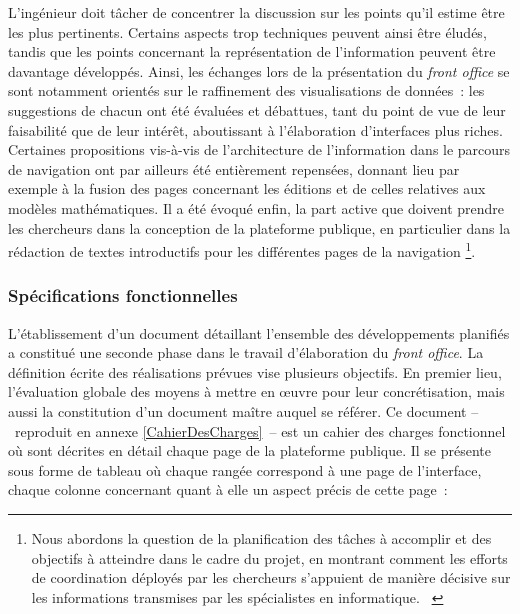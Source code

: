 \documentclass[a4paper,12pt,twoside]{book}
\newcommand{\eng}{\emph}
\newcommand{\fo}{\eng{front office}\xspace}
\newcommand{\g}[1]{\og#1~\fg}
\begin{document}
L'ingénieur doit tâcher de concentrer la discussion sur les points qu'il estime être les plus pertinents. Certains aspects trop techniques peuvent ainsi être éludés, tandis que les points concernant la représentation de l'information peuvent être davantage développés. Ainsi, les échanges lors de la présentation du \fo se sont notamment orientés sur le raffinement des visualisations de données~: les suggestions de chacun ont été évaluées et débattues, tant du point de vue de leur faisabilité que de leur intérêt, aboutissant à l'élaboration d'interfaces plus riches. Certaines propositions vis-à-vis de l'architecture de l'information dans le parcours de navigation ont par ailleurs été entièrement repensées, donnant lieu par exemple à la fusion des pages concernant les éditions et de celles relatives aux modèles mathématiques. Il a été évoqué enfin, la part active que doivent prendre les chercheurs dans la conception de la plateforme publique, en particulier dans la rédaction de textes introductifs pour les différentes pages de la navigation \footnote{\g{Nous abordons la question de la planification des tâches à accomplir et des objectifs à atteindre dans le cadre du projet, en montrant comment les efforts de coordination déployés par les chercheurs s’appuient de manière décisive sur les informations transmises par les spécialistes en informatique.} \cite[§~5]{oberhauserCollaborationsEquivoques2016}}.

				\subsubsection{Spécifications fonctionnelles}
L'établissement d'un document détaillant l'ensemble des développements planifiés a constitué une seconde phase dans le travail d'élaboration du \fo. La définition écrite des réalisations prévues vise plusieurs objectifs. En premier lieu, l'évaluation globale des moyens à mettre en œuvre pour leur concrétisation, mais aussi la constitution d'un document maître auquel se référer. Ce document –~reproduit en annexe \ref{CahierDesCharges}~– est un cahier des charges fonctionnel où sont décrites en détail chaque page de la plateforme publique. Il se présente sous forme de tableau où chaque rangée correspond à une page de l'interface, chaque colonne concernant quant à elle un aspect précis de cette page~:
\end{document}
